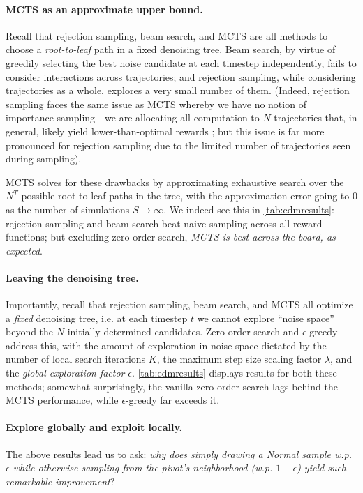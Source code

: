 \documentclass{article}
\begin{document}
\paragraph{MCTS as an approximate upper bound.} Recall that rejection sampling, beam search, and MCTS are all methods to choose a \textit{root-to-leaf} path in a fixed denoising tree. Beam search, by virtue of greedily selecting the best noise candidate at each timestep independently, fails to consider interactions across trajectories; and rejection sampling, while considering trajectories as a whole, explores a very small number of them. (Indeed, rejection sampling faces the same issue as MCTS whereby we have no notion of importance sampling---we are allocating all computation to $N$ trajectories that, in general, likely yield lower-than-optimal rewards \citep{chatterjee2017samplesizerequiredimportance}; but this issue is far more pronounced for rejection sampling due to the limited number of trajectories seen during sampling).

MCTS solves for these drawbacks by approximating exhaustive search over the $N^T$ possible root-to-leaf paths in the tree, with the approximation error going to $0$ as the number of simulations $S \to \infty$. We indeed see this in \autoref{tab:edmresults}: rejection sampling and beam search beat naive sampling across all reward functions; but excluding zero-order search, \textit{MCTS is best across the board, as expected}.

\paragraph{Leaving the denoising tree.} Importantly, recall that rejection sampling, beam search, and MCTS all optimize a \textit{fixed} denoising tree, i.e. at each timestep $t$ we cannot explore ``noise space'' beyond the $N$ initially determined candidates. Zero-order search and $\epsilon$-greedy address this, with the amount of exploration in noise space dictated by the number of local search iterations $K$, the maximum step size scaling factor $\lambda$, and the \textit{global exploration factor} $\epsilon$. \autoref{tab:edmresults} displays results for both these methods; somewhat surprisingly, the vanilla zero-order search lags behind the MCTS performance, while $\epsilon$-greedy far exceeds it.



\paragraph{Explore globally and exploit locally.} The above results lead us to ask: \textit{why does simply drawing a Normal sample w.p. $\epsilon$ while otherwise sampling from the pivot's neighborhood (w.p. $1-\epsilon$) yield such remarkable improvement}?
\end{document}
